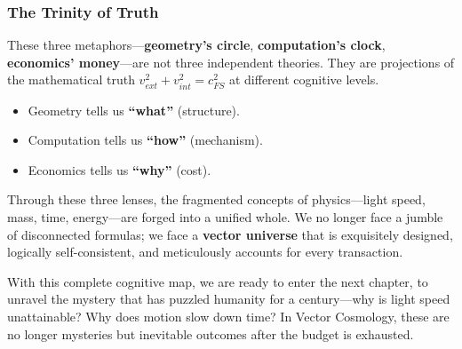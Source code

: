 \subsubsection{The Trinity of Truth}

These three metaphors---\textbf{geometry's circle}, \textbf{computation's clock}, \textbf{economics' money}---are not three independent theories. They are projections of the mathematical truth \textbf{$v_{ext}^2 + v_{int}^2 = c_{FS}^2$} at different cognitive levels.

\begin{itemize}
\item Geometry tells us \textbf{``what''} (structure).

\item Computation tells us \textbf{``how''} (mechanism).

\item Economics tells us \textbf{``why''} (cost).
\end{itemize}

Through these three lenses, the fragmented concepts of physics---light speed, mass, time, energy---are forged into a unified whole. We no longer face a jumble of disconnected formulas; we face a \textbf{vector universe} that is exquisitely designed, logically self-consistent, and meticulously accounts for every transaction.

With this complete cognitive map, we are ready to enter the next chapter, to unravel the mystery that has puzzled humanity for a century---why is light speed unattainable? Why does motion slow down time? In Vector Cosmology, these are no longer mysteries but inevitable outcomes after the budget is exhausted.

